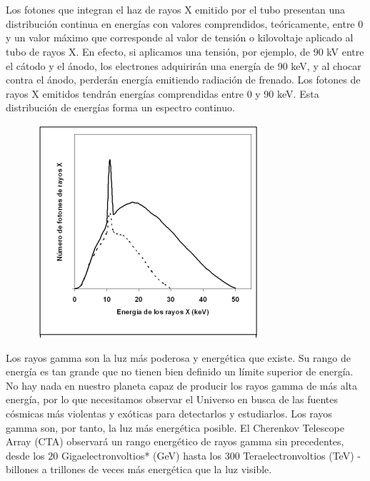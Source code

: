 \documentclass[letterpaper, 12pt]{article}
\begin{document}
\subsection{\cite{radiacion_rayos_x}~\cite{radiacion_rayos_gamma}}

Los fotones que integran el haz de rayos X emitido por el
tubo presentan una distribución continua en energías con
valores comprendidos, teóricamente, entre 0 y un valor
máximo que corresponde al valor de tensión o kilovoltaje
aplicado al tubo de rayos X. En efecto, si aplicamos una
tensión, por ejemplo, de 90 kV entre el cátodo y el ánodo,
los electrones adquirirán una energía de 90 keV, y al
chocar contra el ánodo, perderán energía emitiendo
radiación de frenado. Los fotones de rayos X emitidos
tendrán energías comprendidas entre 0 y 90 keV. Esta
distribución de energías forma un espectro continuo.

\begin{figure}[H]
      \begin{center}
            \includegraphics[width=.7\linewidth]{Images/Image_1.png}
            \caption{}
      \end{center}
\end{figure}

Los rayos gamma son la luz más poderosa y energética que
existe. Su rango de energía es tan grande que no tienen
bien definido un límite superior de energía. No hay nada en
nuestro planeta capaz de producir los rayos gamma de más
alta energía, por lo que necesitamos observar el Universo
en busca de las fuentes cósmicas más violentas y exóticas
para detectarlos y estudiarlos. Los rayos gamma son, por
tanto, la luz más energética posible. El Cherenkov
Telescope Array (CTA) observará un rango energético de
rayos gamma sin precedentes, desde los 20
Gigaelectronvoltios* (GeV) hasta los 300
Teraelectronvoltios (TeV) - billones a trillones de veces
más energética que la luz visible.
\end{document}
